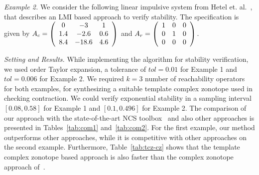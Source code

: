 \emph{Example 2.} We consider the following linear impulsive system
from Hetel et. al.~\cite{2013hetel}, that describes an LMI based
approach to verify stability. The specification is given by
$A_c=\left(\begin{array}{ccc} 0 & -3 & 1\\ 1.4 & -2.6 & 0.6\\ 8.4 &
  -18.6 & 4.6
\end{array}\right)
$ and $A_r=\left(\begin{array}{ccc} 1 & 0 & 0\\ 0 & 1 & 0\\ 0 & 0 & 0
\end{array}\right).$

\emph{Setting and Results.}  While implementing the algorithm for
stability verification, we used order Taylor expansion, a tolerance of
$tol=0.01$ for Example 1 and $tol=0.006$ for Example 2.  We required
$k=3$ number of reachability operators for both examples, for
synthesizing a suitable template complex zonotope used in checking
contraction.  We could verify exponential stability in a sampling
interval $[0.08, 0.58]$ for Example 1 and $[0.1,0.496]$ for Example 2.
The comparison of our approach with the state-of-the-art NCS
toolbox~\cite{BauLoo_NECSYS12a} and also other approaches is presented in
Tables~\ref{tab:com1} and~\ref{tab:com2}.  For the first example, our
method outperforms other approaches, while it is competitive with
other approaches on the second example.  Furthermore,
Table~\ref{tab:tcz-cz} shows that the template complex zonotope based
approach is also faster than the complex zonotope approach
of~\cite{arvind2016lis}.








